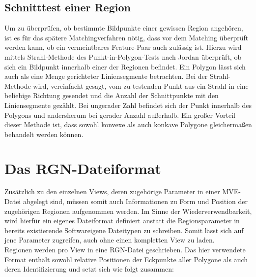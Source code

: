 \subsection{Schnitttest einer Region}
Um zu \"uberpr\"ufen, ob bestimmte Bildpunkte einer gewissen Region angeh\"oren, ist es f\"ur das sp\"atere Matchingverfahren n\"otig, dass vor dem Matching \"uberpr\"uft werden kann, ob ein vermeintbares Feature-Paar auch zul\"assig ist. Hierzu wird mittels Strahl-Methode des Punkt-in-Polygon-Tests nach Jordan\cite{hake1994kartographie}\cite{bartelme1995geoinformatik} \"uberpr\"uft, ob sich ein Bildpunkt innerhalb einer der Regionen befindet. Ein Polygon l\"asst sich auch als eine Menge gerichteter Liniensegmente betrachten. Bei der Strahl-Methode wird, vereinfacht gesagt, vom zu testenden Punkt aus ein Strahl in eine beliebige Richtung gesendet und die Anzahl der Schnittpunkte mit den Liniensegmente gez\"ahlt. Bei ungerader Zahl befindet sich der Punkt innerhalb des Polygons und andersherum bei gerader Anzahl au\ss erhalb. Ein gro\ss er Vorteil dieser Methode ist, dass sowohl konvexe als auch konkave Polygone gleicherma\ss en behandelt werden k\"onnen. 

\section{Das RGN-Dateiformat}
Zus\"atzlich zu den einzelnen Views, deren zugeh\"orige Parameter in einer MVE-Datei abgelegt sind, m\"ussen somit auch Informationen zu Form und Position der zugeh\"origen Regionen aufgenommen werden. Im Sinne der Wiederverwendbarkeit, wird hierf\"ur ein eigenes Dateiformat 
definiert anstatt die Regionsparameter in bereits existierende Softwareigene Dateitypen zu schreiben. Somit l\"asst sich auf jene Parameter zugreifen, auch ohne einen kompletten View zu laden.\\
Regionen werden pro View in eine RGN-Datei geschrieben. Das hier verwendete Format enth\"alt sowohl relative Positionen der Eckpunkte aller Polygone als auch deren Identifizierung und setzt sich wie folgt zusammen:


